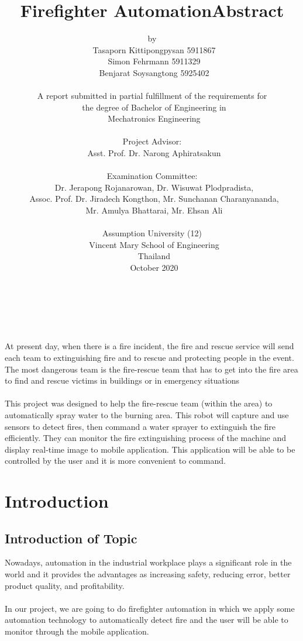 \documentclass[a4paper,12pt]{article}
\title{Firefighter Automation}
\author{by\\\
Tasaporn Kittipongpysan 5911867\\\
Simon Fehrmann 5911329 \\\
Benjarat Soysangtong 5925402 \\\\
A report submitted in partial fulfillment of the requirements for\\\
the degree of Bachelor of Engineering in\\\
Mechatronics Engineering \\\\
Project Advisor: \\\ Asst. Prof. Dr. Narong Aphiratsakun  \\\\
Examination Committee: \\\  Dr. Jerapong Rojanarowan, Dr. Wisuwat Plodpradista,  \\\
Assoc. Prof. Dr. Jiradech Kongthon, Mr. Sunchanan Charanyananda, \\\ Mr. Amulya Bhattarai, Mr. Ehsan Ali \\\\
Assumption University (12) \\\
Vincent Mary School of Engineering \\\ Thailand \\\
October 2020 \\\

 }
\begin{document}
  \maketitle
  \newpage
\title{Abstract}\\\\
  At present day, when there is a fire incident, the fire and rescue service will send each team to extinguishing fire and to rescue and protecting people in the event. The most dangerous team is the fire-rescue team that has to get into the fire area to find and rescue victims in buildings or in emergency situations
 \\\\This project was designed to help the fire-rescue team (within the area) to automatically spray water to the burning area. This robot will capture and use sensors to detect fires, then command a water sprayer to extinguish the fire efficiently. They can monitor the fire extinguishing process of the machine and display real-time image to mobile application. This application will be able to be controlled by the user and it is more convenient to command. 

 \maketitle
            \newpage
 \section{Introduction}
 \subsection{Introduction of Topic }
  Nowadays, automation in the industrial workplace plays a significant role in the world and it provides the advantages as increasing safety, reducing error, better product quality, and profitability.\\\\
In our project, we are going to do firefighter automation in which we apply some automation technology to automatically detect fire and the user will be able to monitor through the mobile application.\\\\
\end{document}
